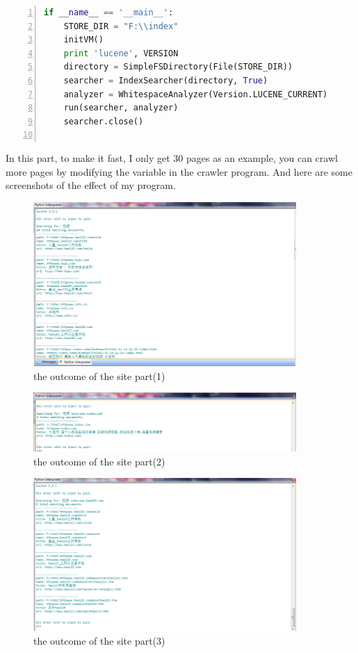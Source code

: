 \documentclass{article}
\begin{document}
\begin{lstlisting}[language=python,numbers=left,frame=leftline]
if __name__ == '__main__':
    STORE_DIR = "F:\\index"
    initVM()
    print 'lucene', VERSION
    directory = SimpleFSDirectory(File(STORE_DIR))
    searcher = IndexSearcher(directory, True)
    analyzer = WhitespaceAnalyzer(Version.LUCENE_CURRENT)
    run(searcher, analyzer)
    searcher.close()


\end{lstlisting}
In this part, to make it fast, I only get 30 pages as an example, you can crawl more pages by modifying the variable in the crawler program. And here are some screenshots of the effect of my program.\\
\begin{figure}[htbp]
\centering
\includegraphics[width=10cm]{21.png}
\caption{the outcome of the site part(1)}
\end{figure}
\begin{figure}[htbp]
\centering
\includegraphics[width=10cm]{22.png}
\caption{the outcome of the site part(2)}
\end{figure}
\begin{figure}[htbp]
\centering
\includegraphics[width=10cm]{23.png}
\caption{the outcome of the site part(3)}
\end{figure}
\end{document}
